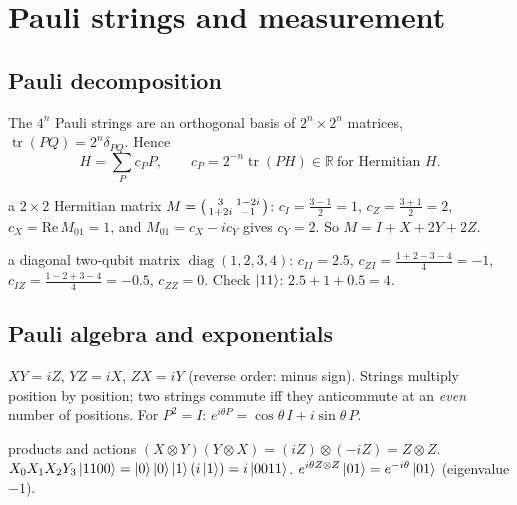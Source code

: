 \documentclass[11pt,a4paper,openany]{book}
\newcounter{wex}[chapter]
\begin{document}
\section{Pauli strings and measurement}
\subsection{Pauli decomposition}
The $4^n$ Pauli strings are an orthogonal basis of $2^n\times2^n$ matrices, $\operatorname{tr}(PQ) = 2^n\delta_{PQ}$. Hence
\[ H = \sum_Pc_PP, \qquad c_P = 2^{-n}\operatorname{tr}(PH) \in \mathbb R\ \text{for Hermitian } H. \]
\begin{wexample}{a $2\times2$ Hermitian matrix}
$M = \begin{psmallmatrix}3 & 1 - 2i\\ 1 + 2i & -1\end{psmallmatrix}$: $c_I = \frac{3 - 1}{2} = 1$, $c_Z = \frac{3 + 1}{2} = 2$, $c_X = \mathrm{Re}\,M_{01} = 1$, and $M_{01} = c_X - ic_Y$ gives $c_Y = 2$.
So $M = I + X + 2Y + 2Z$.
\end{wexample}
\begin{wexample}{a diagonal two-qubit matrix}
$\operatorname{diag}(1, 2, 3, 4)$: $c_{II} = 2.5$, $c_{ZI} = \frac{1 + 2 - 3 - 4}{4} = -1$, $c_{IZ} = \frac{1 - 2 + 3 - 4}{4} = -0.5$, $c_{ZZ} = 0$. Check $\ket{11}$: $2.5 + 1 + 0.5 = 4$.
\end{wexample}

\subsection{Pauli algebra and exponentials}
$XY = iZ$, $YZ = iX$, $ZX = iY$ (reverse order: minus sign). Strings multiply position by position; two strings commute iff they anticommute at
an \emph{even} number of positions. For $P^2 = I$: $e^{i\theta P} = \cos\theta\,I + i\sin\theta\,P$.
\begin{wexample}{products and actions}
$(X\otimes Y)(Y\otimes X) = (iZ)\otimes(-iZ) = Z\otimes Z$. \quad $X_0X_1X_2Y_3\ket{1100} = \ket{0}\ket{0}\ket{1}(i\ket1) = i\ket{0011}$. \quad
$e^{i\theta Z\otimes Z}\ket{01} = e^{-i\theta}\ket{01}$ (eigenvalue $-1$).
\end{wexample}
\end{document}
